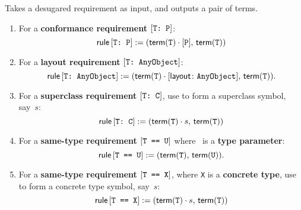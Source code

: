 \documentclass[../generics]{subfiles}
\begin{document}
\begin{algorithm}\label{build rule}
Takes a desugared requirement as input, and outputs a pair of terms.
\begin{enumerate}
\item For a \textbf{conformance requirement} $[\texttt{T:~P}]$:
\[\mathsf{rule}\, [\texttt{T:~P}] := (\mathsf{term}(\texttt{T})\cdot[\texttt{P}],\,\mathsf{term}(\texttt{T}))\]
\item For a \textbf{layout requirement} $[\texttt{T:~AnyObject}]$:
\[\Rule\, \TAnyObject := (\Term(\tT)\cdot\layoutsym{AnyObject},$ $\Term(\tT)).\]
\item For a \textbf{superclass requirement} $[\texttt{T:~C}]$, use  to form a superclass symbol, say~$s$:
\[\mathsf{rule}\, [\texttt{T:~C}] := (\mathsf{term}(\texttt{T})\cdot s,\,\mathsf{term}(\texttt{T}))\]
\item For a \textbf{same-type requirement} $[\texttt{T == U}]$ where \tU\ is a \textbf{type parameter}:
\[\mathsf{rule}\, [\texttt{T == U}] := (\mathsf{term}(\texttt{T}),\,\mathsf{term}(\texttt{U})).\]
\item For a \textbf{same-type requirement} $[\texttt{T == X}]$, where \texttt{X} is a \textbf{concrete type}, use  to form a concrete type symbol, say~$s$:
\[\mathsf{rule}\, [\texttt{T == X}] := (\mathsf{term}(\texttt{T})\cdot s,\,\mathsf{term}(\texttt{T}))\]
\end{enumerate}
\end{algorithm}
\end{document}

